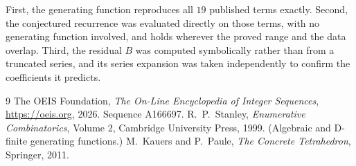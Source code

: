 \documentclass[11pt,a4paper]{article}
\theoremstyle{plain}
\theoremstyle{definition}
\begin{document}
First, the generating function reproduces all $19$ published terms exactly. Second,
the conjectured recurrence was evaluated directly on those terms, with no generating function
involved, and holds wherever the proved range and the data overlap. Third, the residual $B$ was
computed symbolically rather than from a truncated series, and its series expansion was taken
independently to confirm the coefficients it predicts.

\begin{thebibliography}{9}
 The OEIS Foundation, \emph{The On-Line Encyclopedia of Integer Sequences},
\url{https://oeis.org}, 2026. Sequence A166697.
 R.~P.~Stanley, \emph{Enumerative Combinatorics}, Volume 2, Cambridge
University Press, 1999. (Algebraic and D-finite generating functions.)
 M.~Kauers and P.~Paule, \emph{The Concrete Tetrahedron}, Springer, 2011.
\end{thebibliography}
\end{document}
